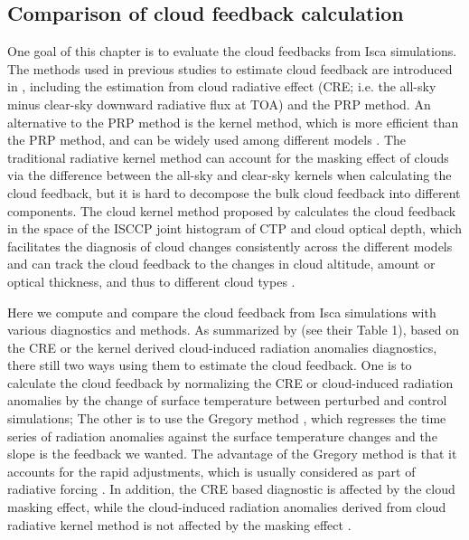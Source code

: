 
\subsection{Comparison of cloud feedback calculation}
\label{sec:cmp_cld_fbk_method_result}


One goal of this chapter is to evaluate the cloud feedbacks from Isca simulations. The methods used in previous studies to estimate cloud feedback are introduced in , including the estimation from cloud radiative effect (CRE; i.e. the all-sky minus clear-sky downward radiative flux at TOA) and the PRP method. An alternative to the PRP method is the kernel method, which is more efficient than the PRP method, and can be widely used among different models \citep{Soden2006,Soden2008}. The traditional radiative kernel method can account for the masking effect of clouds via the difference between the all-sky and clear-sky kernels when calculating the cloud feedback, but it is hard to decompose the bulk cloud feedback into different components. The cloud kernel method proposed by \cite{Zelinka2012computing1,Zelinka2012computing2} calculates the cloud feedback in the space of the ISCCP joint histogram of CTP and cloud optical depth, which facilitates the diagnosis of cloud changes consistently across the different models and can track the cloud feedback to the changes in cloud altitude, amount or optical thickness, and thus to different cloud types \citep{Siebesma2020clouds}.

Here we compute and compare the cloud feedback from Isca simulations with various diagnostics and methods. As summarized by \cite{Zelinka2013} (see their Table 1), based on the CRE or the kernel derived cloud-induced radiation anomalies diagnostics, there still two ways using them to estimate the cloud feedback. One is to calculate the cloud feedback by normalizing the CRE or cloud-induced radiation anomalies by the change of surface temperature between perturbed and control simulations; The other is to use the Gregory method \citep{Gregory2004}, which regresses the time series of radiation anomalies against the surface temperature changes and the slope is the feedback we wanted. The advantage of the Gregory method is that it accounts for the rapid adjustments, which is usually considered as part of radiative forcing \citep{Andrews2012cloud,Siebesma2020clouds}. In addition, the CRE based diagnostic is affected by the cloud masking effect, while the cloud-induced radiation anomalies derived from cloud radiative kernel method is not affected by the masking effect \citep{Zelinka2013}.


